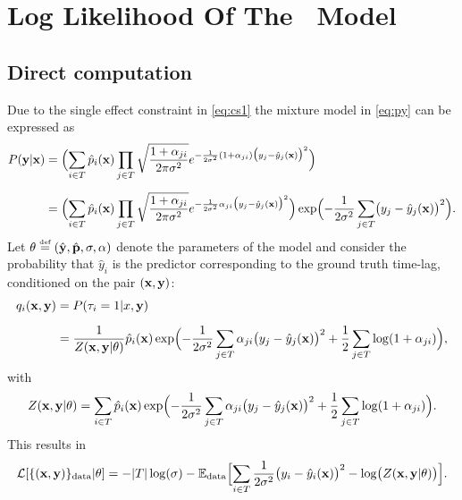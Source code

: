\chapter{Log Likelihood Of The \XX \ Model}\label{app:LL}

\section{Direct computation}
Due to the single effect constraint in \cref{eq:cs1} the mixture model in 
\cref{eq:py} can be expressed as  
\begin{align*}
P({\bf y}\vert \mathbf{x}) &= \Bigl(\sum_{i\in T}\hat p_i(\mathbf{x})\prod_{j\in T}\sqrt{\frac{1+\alpha_{ji}}{2\pi\sigma^2}}e^{-\frac{1}{2\sigma^2}(1+\alpha_{ji})\bigl(y_j-\hat y_j(\mathbf{x})\bigr)^2}\Bigr)\\[0.2cm]
&= \Bigl(\sum_{i\in T}\hat p_i(\mathbf{x})\prod_{j\in T}\sqrt{\frac{1+\alpha_{ji}}{2\pi\sigma^2}}e^{-\frac{1}{2\sigma^2}\alpha_{ji}\bigl(y_j-\hat y_j(\mathbf{x})\bigr)^2}\Bigr)
\exp\Bigl(-\frac{1}{2\sigma^2}\sum_{j\in T}\bigl(y_j-\hat y_j(\mathbf{x})\bigr)^2\Bigr).
\end{align*}
Let $\theta \stackrel{\mbox{\upshape\tiny def}}{=} (\hat {\bf y},\hat{\bf p},\sigma,{\bf \alpha})$ denote the 
parameters of the model and consider the probability that $\hat y_i$ is the 
predictor corresponding to the ground truth time-lag, conditioned on the pair 
$(\mathbf{x},{\bf y})$: 
\begin{align*}
  q_i(\mathbf{x},{\bf y}) &= P(\tau_i=1 \vert x,{\bf y})\\[0.2cm]
  &= \frac{1}{Z(\mathbf{x},{\bf y}\vert\theta)}
  \hat p_i(\mathbf{x})\exp\Bigl(-\frac{1}{2\sigma^2}\sum_{j\in  T}\alpha_{ji}\bigl(y_j-\hat y_j(\mathbf{x})\bigr)^2+\frac{1}{2}\sum_{j\in  T}\log(1+\alpha_{ji})\Bigr),
\end{align*}
with
\[
Z(\mathbf{x},{\bf y}\vert\theta) = \sum_{i\in T}  \hat p_i(\mathbf{x})\exp\Bigl(-\frac{1}{2\sigma^2}\sum_{j\in  T}\alpha_{ji}\bigl(y_j-\hat y_j(\mathbf{x})\bigr)^2+\frac{1}{2}\sum_{j\in  T}\log(1+\alpha_{ji})\Bigr).
\]
This results in 
\[
  {\cal L}[\{(\mathbf{x},{\bf y})\}_{\rm data}\vert\theta] = -\vert  T\vert\log(\sigma)-{\mathbb E}_{\rm data}
  \Bigl[\sum_{i\in T}\frac{1}{2\sigma^2}\bigl(y_i-\hat y_i(\mathbf{x})\bigr)^2-\log\bigl(Z(\mathbf{x},{\bf y}\vert\theta)\bigr)\Bigr].
\]

